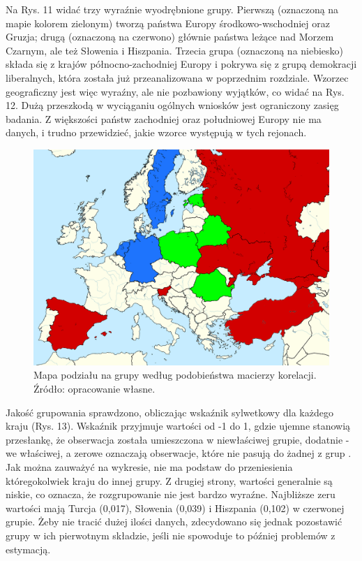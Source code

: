 \documentclass[12pt]{article}
\begin{document}
Na Rys. 11 widać trzy wyraźnie wyodrębnione grupy. Pierwszą (oznaczoną na mapie kolorem zielonym) tworzą państwa Europy środkowo-wschodniej oraz Gruzja; drugą (oznaczoną na czerwono) głównie państwa leżące nad Morzem Czarnym, ale też Słowenia i Hiszpania. Trzecia grupa (oznaczoną na niebiesko) składa się z krajów północno-zachodniej Europy i pokrywa się z grupą demokracji liberalnych, która została już przeanalizowana w poprzednim rozdziale. Wzorzec geograficzny jest więc wyraźny, ale nie pozbawiony wyjątków, co widać na Rys. 12. Dużą przeszkodą w wyciąganiu ogólnych wniosków jest ograniczony zasięg badania. Z większości państw zachodniej oraz południowej Europy nie ma danych, i trudno przewidzieć, jakie wzorce występują w tych rejonach.

\begin{figure}
\includegraphics[width=450px]{map2} \caption{Mapa podziału na grupy według podobieństwa macierzy korelacji. Źródło: opracowanie własne.}\label{fig:map2}
\end{figure}

Jakość grupowania sprawdzono, obliczając wskaźnik sylwetkowy dla każdego kraju (Rys. 13). Wskaźnik przyjmuje wartości od -1 do 1, gdzie ujemne stanowią przesłankę, że obserwacja została umieszczona w niewłaściwej grupie, dodatnie - we właściwej, a zerowe oznaczają obserwacje, które nie pasują do żadnej z grup \citep{Rousseeuw}. Jak można zauważyć na wykresie, nie ma podstaw do przeniesienia któregokolwiek kraju do innej grupy. Z drugiej strony, wartości generalnie są niskie, co oznacza, że rozgrupowanie nie jest bardzo wyraźne. Najbliższe zeru wartości mają Turcja (0,017), Słowenia (0,039) i Hiszpania (0,102) w czerwonej grupie. Żeby nie tracić dużej ilości danych, zdecydowano się jednak pozostawić grupy w ich pierwotnym składzie, jeśli nie spowoduje to później problemów z estymacją.
\end{document}
